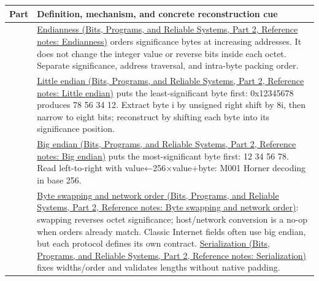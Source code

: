 {\def\LTcaptype{none} %
\begin{longtable}[]{@{}
  >{\raggedright\arraybackslash}p{}
  >{\raggedright\arraybackslash}p{}@{}}
\toprule\noalign{}
\begin{minipage}[b]{\linewidth}\raggedright
Part
\end{minipage} & \begin{minipage}[b]{\linewidth}\raggedright
Definition, mechanism, and concrete reconstruction cue
\end{minipage} \\
\midrule\noalign{}
\endhead
\bottomrule\noalign{}
\endlastfoot
41 & \href{../01-Bits-Programs-and-Reliable-Systems-P02/main.pdf\#appendix-bc07c3d25b18}{Endianness (Bits, Programs, and Reliable Systems, Part 2, Reference notes: Endianness)} orders significance bytes at increasing addresses. It does not change the integer value or reverse bits inside each octet. Separate significance, address traversal, and intra-byte packing order. \\
42 & \href{../01-Bits-Programs-and-Reliable-Systems-P02/main.pdf\#appendix-367b6abf460e}{Little endian (Bits, Programs, and Reliable Systems, Part 2, Reference notes: Little endian)} puts the least-significant byte first: 0x12345678 produces 78 56 34 12. Extract byte i by unsigned right shift by 8i, then narrow to eight bits; reconstruct by shifting each byte into its significance position. \\
43 & \href{../01-Bits-Programs-and-Reliable-Systems-P02/main.pdf\#appendix-92e040df969a}{Big endian (Bits, Programs, and Reliable Systems, Part 2, Reference notes: Big endian)} puts the most-significant byte first: 12 34 56 78. Read left-to-right with value←256×value+byte: M001 Horner decoding in base 256. \\
44 & \href{../01-Bits-Programs-and-Reliable-Systems-P02/main.pdf\#appendix-11ba36693aa2}{Byte swapping and network order (Bits, Programs, and Reliable Systems, Part 2, Reference notes: Byte swapping and network order)}: swapping reverses octet significance; host/network conversion is a no-op when orders already match. Classic Internet fields often use big endian, but each protocol defines its own contract. \href{../01-Bits-Programs-and-Reliable-Systems-P02/main.pdf\#appendix-91d09ebed979}{Serialization (Bits, Programs, and Reliable Systems, Part 2, Reference notes: Serialization)} fixes widths/order and validates lengths without native padding. \\

\end{longtable}}
